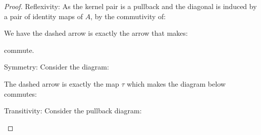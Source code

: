 \documentclass[a4paper]{article}
\DeclareMathOperator{\pr}{\sf pr}
\begin{document}
\begin{proof}
    Reflexivity: As the kernel pair is a pullback and the diagonal is induced by a pair of identity maps of $A$, by the commutivity of:

    \begin{center}
    \end{center}

    We have the dashed arrow is exactly the arrow that makes:

    \begin{center}
    \end{center}

    commute.

    Symmetry: Consider the diagram:
     
    \begin{center}
    \end{center}

    The dashed arrow is exactly the map $\tau$ which makes the diagram below commutes:

    \begin{center}
    \end{center}

    Transitivity: Consider the pullback diagram:

    \begin{center}
    \end{center}
    

\end{proof}
\end{document}
